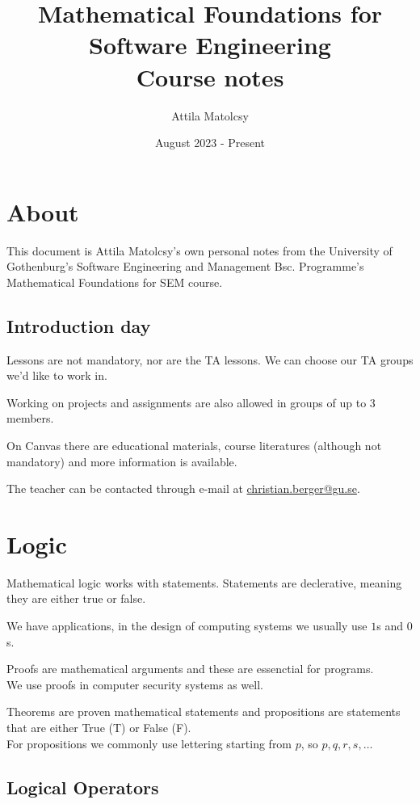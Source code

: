 \documentclass{article}
\title{Mathematical Foundations for Software Engineering \\[1ex] \large Course notes}
\author{Attila Matolcsy}
\date{\nth{25} August 2023 - Present}
\let\stdsection\section
\renewcommand\section{\newpage\stdsection}
\begin{document}
\maketitle

\tableofcontents

\section{About}

This document is Attila Matolcsy's own personal notes from the University of Gothenburg's Software Engineering and Management Bsc. Programme's Mathematical Foundations for SEM course.

\subsection*{Introduction day}

Lessons are not mandatory, nor are the TA lessons. We can choose our TA groups we'd like to work in.

Working on projects and assignments are also allowed in groups of up to 3 members.

On Canvas there are educational materials, course literatures (although not mandatory) and more information is available.

The teacher can be contacted through e-mail at \href{mailto:christian.berger@gu.se}{christian.berger@gu.se}.

\section{Logic}

Mathematical logic works with statements. Statements are declerative, meaning they are either true or false.

We have applications, in the design of computing systems we usually use $1$s and $0$s.

Proofs are mathematical arguments and these are essenctial for programs.\\
We use proofs in computer security systems as well.

Theorems are proven mathematical statements and propositions are statements that are either True (T) or False (F).\\
For propositions we commonly use lettering starting from $p$, so $p,q,r,s,\dots$

\subsection{Logical Operators}
\end{document}
